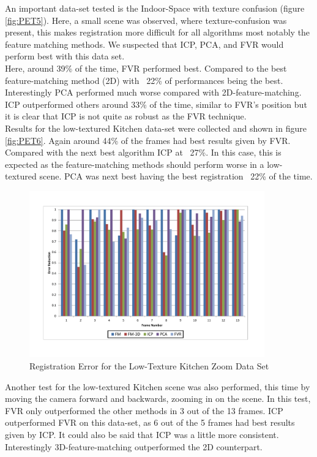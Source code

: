 An important data-set tested is the Indoor-Space with texture confusion (figure \ref{fig:PET5}). Here, a small scene was observed, where texture-confusion was present, this makes registration more difficult for all algorithms most notably the feature matching methods. We suspected that ICP, PCA, and FVR would perform best with this data set. \\

Here, around 39\% of the time, FVR performed best. Compared to the best feature-matching method (2D) with ~22\% of performances being the best. Interestingly PCA performed much worse compared with 2D-feature-matching. ICP outperformed others around 33\% of the time, similar to FVR's position but it is clear that ICP is not quite as robust as the FVR technique. \\ 

Results for the low-textured Kitchen data-set were collected and shown in figure \ref{fig:PET6}. Again around 44\% of the frames had best results given by FVR. Compared with the next best algorithm ICP at ~27\%. In this case, this is expected as the feature-matching methods should perform worse in a low-textured scene. PCA was next best having the best registration ~22\% of the time. \\

\begin{figure}[!htb]
\centering
\includegraphics[width=4.0in]{images/results/Kitchen_Little_Texture_Zoom}
\caption{Registration Error for the Low-Texture Kitchen Zoom Data Set}
\label{fig:PET7}
\end{figure}

Another test for the low-textured Kitchen scene was also performed, this time by moving the camera forward and backwards, zooming in on the scene. In this test, FVR only outperformed the other methods in 3 out of the 13 frames. ICP outperformed FVR on this data-set, as 6 out of the 5 frames had best results given by ICP. It could also be said that ICP was a little more consistent. Interestingly 3D-feature-matching outperformed the 2D counterpart. \\

